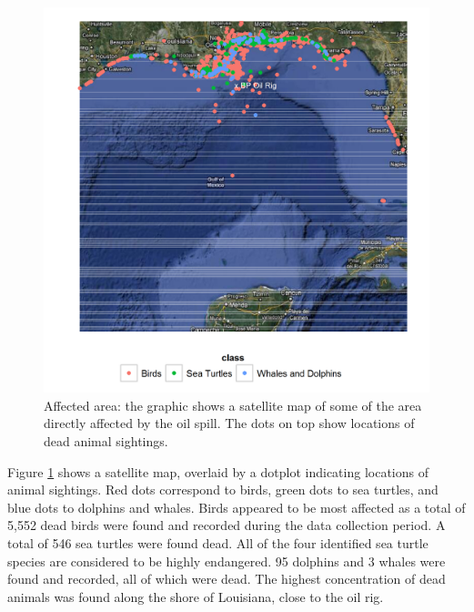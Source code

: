 \documentclass[11pt]{article}
\begin{document}
\begin{figure}[htbp] %
   \centering
   \includegraphics[width=5in]{animal_deaths.png} 
   \caption{Affected area: the graphic shows a satellite map of some of the area directly affected by the oil spill. The dots on top show locations of dead animal sightings. }
   \label{deaths}
\end{figure}
Figure \ref{deaths} shows a satellite map, overlaid by a dotplot indicating locations of animal sightings. Red dots correspond to birds, green dots to sea turtles, and blue dots to dolphins and whales.  Birds appeared to be most affected as a total of 5,552 dead birds were found and recorded during the data collection period.  A total of 546 sea turtles were found dead.  All of the four identified sea turtle species are considered to be highly endangered.  95 dolphins and 3 whales were found and recorded, all of which were dead. The highest concentration of dead animals was found along the shore of Louisiana, close to the oil rig.  
\end{document}
